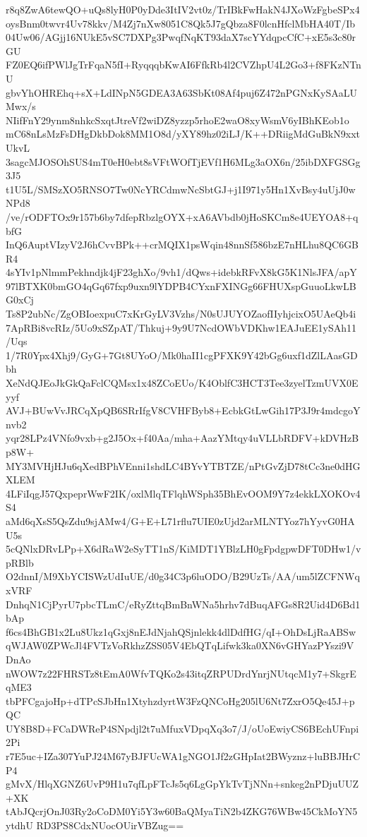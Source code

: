 r8q8ZwA6tewQO+uQs8lyH0P0yDde3ItIV2vt0z/TrIBkFwHakN4JXoWzFgbeSPx4
oysBnm0twvr4Uv78kkv/M4Zj7nXw8051C8Qk5J7gQbza8F0lcnHfclMbHA40T/Ib
04Uw06/AGjj16NUkE5vSC7DXPg3PwqfNqKT93daX7scYYdqpcCfC+xE5s3c80rGU
FZ0EQ6ifPWlJgTrFqaN5fI+RyqqqbKwAI6FfkRb4l2CVZhpU4L2Go3+f8FKzNTnU
gbvYhOHREhq+sX+LdINpN5GDEA3A63SbKt08Af4puj6Z472nPGNxKySAaLUMwx/s
NIifFnY29ynm8nhkcSxqtJtreVf2wiDZ8yzzp5rhoE2waO8xyWsmV6yIBhKEob1o
mC68nLsMzFsDHgDkbDok8MM1O8d/yXY89hz02iLJ/K++DRiigMdGuBkN9xxtUkvL
3sagcMJOSOhSUS4mT0eH0ebt8sVFtWOfTjEVf1H6MLg3aOX6n/25ibDXFGSGg3J5
t1U5L/SMSzXO5RNSO7Tw0NcYRCdmwNcSbtGJ+j1I971y5Hn1XvBsy4uUjJ0wNPd8
/ve/rODFTOx9r157b6by7dfepRbzlgOYX+xA6AVbdb0jHoSKCm8e4UEYOA8+qbfG
InQ6AuptVIzyV2J6hCvvBPk++crMQIX1psWqin48nnSf586bzE7nHLhu8QC6GBR4
4sYIv1pNlmmPekhndjk4jF23ghXo/9vh1/dQws+idebkRFvX8kG5K1NlsJFA/apY
97lBTXK0bmGO4qGq67fxp9uxn9lYDPB4CYxnFXINGg66FHUXspGuuoLkwLBG0xCj
Ts8P2ubNc/ZgOBIoexpuC7xKrGyLV3Vzhs/N0sUJUYOZaofIIyhjcixO5UAeQb4i
7ApRBi8vcRIz/5Uo9xSZpAT/Thkuj+9y9U7NcdOWbVDKhw1EAJuEE1ySAh11/Uqs
1/7R0Ypx4Xhj9/GyG+7Gt8UYoO/Mk0haII1cgPFXK9Y42bGg6uxf1dZlLAasGDbh
XeNdQJEoJkGkQaFclCQMsx1x48ZCoEUo/K4OblfC3HCT3Tee3zyelTzmUVX0Eyyf
AVJ+BUwVvJRCqXpQB6SRrIfgV8CVHFByb8+EcbkGtLwGih17P3J9r4mdcgoYnvb2
yqr28LPz4VNfo9vxb+g2J5Ox+f40Aa/mha+AazYMtqy4uVLLbRDFV+kDVHzBp8W+
MY3MVHjHJu6qXedBPhVEnni1shdLC4BYvYTBTZE/nPtGvZjD78tCc3ne0dHGXLEM
4LFiIqgJ57QxpeprWwF2IK/oxlMlqTFlqhWSph35BhEvOOM9Y7z4ekkLXOKOv4S4
aMd6qXsS5QsZdu9sjAMw4/G+E+L71rflu7UIE0zUjd2arMLNTYoz7hYyvG0HAU5s
5cQNlxDRvLPp+X6dRaW2eSyTT1nS/KiMDT1YBlzLH0gFpdgpwDFT0DHw1/vpRBlb
O2dnnI/M9XbYCISWzUdIuUE/d0g34C3p6luODO/B29UzTs/AA/um5lZCFNWqxVRF
DnhqN1CjPyrU7pbcTLmC/eRyZttqBmBnWNa5hrhv7dBuqAFGs8R2Uid4D6Bd1bAp
f6cs4BhGB1x2Lu8Ukz1qGxj8nEJdNjahQSjnlekk4dlDdfHG/qI+OhDsLjRaABSw
qWJAW0ZPWcJl4FVTzVoRkhzZSS05V4EbQTqLifwk3ka0XN6vGHYazPYszi9VDnAo
nWOW7z22FHRSTz8tEmA0WfvTQKo2s43itqZRPUDrdYnrjNUtqcM1y7+SkgrEqME3
tbPFCgajoHp+dTPcSJbHn1XtyhzdyrtW3FzQNCoHg205lU6Nt7ZxrO5Qe45J+pQC
UY8B8D+FCaDWReP4SNpdjl2t7uMfuxVDpqXq3o7/J/oUoEwiyCS6BEchUFnpi2Pi
r7E5uc+IZa307YuPJ24M67yBJFUcWA1gNGO1Jf2zGHpIat2BWyznz+luBBJHrCP4
gMvX/HlqXGNZ6UvP9H1u7qfLpFTcJs5q6LgGpYkTvTjNNn+snkeg2nPDjuUUZ+XK
tAbJQcrjOnJ03Ry2oCoDM0Yi5Y3w60BaQMyaTiN2b4ZKG76WBw45CkMoYN5ytdhU
RD3PS8CdxNUocOUirVBZug==
